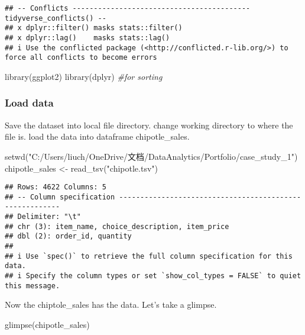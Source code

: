 \documentclass[
]{article}
\newenvironment{Shaded}{\begin{snugshade}}{\end{snugshade}}
\newcommand{\CommentTok}[1]{\textcolor[rgb]{0.56,0.35,0.01}{\textit{#1}}}
\newcommand{\FunctionTok}[1]{\textcolor[rgb]{0.00,0.00,0.00}{#1}}
\newcommand{\NormalTok}[1]{#1}
\newcommand{\OtherTok}[1]{\textcolor[rgb]{0.56,0.35,0.01}{#1}}
\newcommand{\StringTok}[1]{\textcolor[rgb]{0.31,0.60,0.02}{#1}}
\begin{document}
\begin{verbatim}
## -- Conflicts ------------------------------------------ tidyverse_conflicts() --
## x dplyr::filter() masks stats::filter()
## x dplyr::lag()    masks stats::lag()
## i Use the conflicted package (<http://conflicted.r-lib.org/>) to force all conflicts to become errors
\end{verbatim}

\begin{Shaded}
\begin{Highlighting}[]
\FunctionTok{library}\NormalTok{(ggplot2)}
\FunctionTok{library}\NormalTok{(dplyr) }\CommentTok{\#for sorting}
\end{Highlighting}
\end{Shaded}

\hypertarget{load-data}{%
\subsubsection{Load data}\label{load-data}}

Save the dataset into local file directory. change working directory to
where the file is. load the data into dataframe chipotle\_sales.

\begin{Shaded}
\begin{Highlighting}[]
\FunctionTok{setwd}\NormalTok{(}\StringTok{"C:/Users/liuch/OneDrive/文档/DataAnalytics/Portfolio/case\_study\_1"}\NormalTok{)}
\NormalTok{chipotle\_sales }\OtherTok{\textless{}{-}} \FunctionTok{read\_tsv}\NormalTok{(}\StringTok{"chipotle.tsv"}\NormalTok{)}
\end{Highlighting}
\end{Shaded}

\begin{verbatim}
## Rows: 4622 Columns: 5
## -- Column specification --------------------------------------------------------
## Delimiter: "\t"
## chr (3): item_name, choice_description, item_price
## dbl (2): order_id, quantity
## 
## i Use `spec()` to retrieve the full column specification for this data.
## i Specify the column types or set `show_col_types = FALSE` to quiet this message.
\end{verbatim}

Now the chiptole\_sales has the data. Let's take a glimpse.

\begin{Shaded}
\begin{Highlighting}[]
\FunctionTok{glimpse}\NormalTok{(chipotle\_sales)}
\end{Highlighting}
\end{Shaded}
\end{document}
